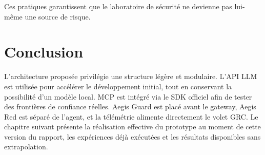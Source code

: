 Ces pratiques garantissent que le laboratoire de sécurité ne devienne pas lui-même une source de risque.

\section*{Conclusion}

L'architecture proposée privilégie une structure légère et modulaire. L'API LLM est utilisée pour accélérer le développement initial, tout en conservant la possibilité d'un modèle local. MCP est intégré via le SDK officiel afin de tester des frontières de confiance réelles. Aegis Guard est placé avant le gateway, Aegis Red est séparé de l'agent, et la télémétrie alimente directement le volet GRC. Le chapitre suivant présente la réalisation effective du prototype au moment de cette version du rapport, les expériences déjà exécutées et les résultats disponibles sans extrapolation.
